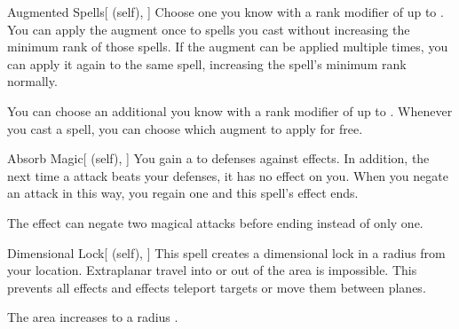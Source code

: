 \lowercase{\hypertarget{spell:Augmented Spells}{}}\label{spell:Augmented Spells}
\begin{attuneability}[Rank 5]{\hypertarget{spell:Augmented Spells}{Augmented Spells}}[ (self), ]
Choose one  you know with a rank modifier of up to .
You can apply the augment once to spells you cast without increasing the minimum rank of those spells.
If the augment can be applied multiple times, you can apply it again to the same spell, increasing the spell's minimum rank normally.

\rankline
{} You can choose an additional  you know with a rank modifier of up to .
Whenever you cast a spell, you can choose which augment to apply for free.
\end{attuneability}
\vspace{0.25em}



\lowercase{\hypertarget{spell:Absorb Magic}{}}\label{spell:Absorb Magic}
\begin{attuneability}[Rank 6]{\hypertarget{spell:Absorb Magic}{Absorb Magic}}[ (self), ]
You gain a   to defenses against  effects.
In addition, the next time a  attack beats your defenses, it has no effect on you.
When you negate an attack in this way, you regain one  and this spell's effect ends.

\rankline
{} The effect can negate two magical attacks before ending instead of only one.
\end{attuneability}
\vspace{0.25em}



\lowercase{\hypertarget{spell:Dimensional Lock}{}}\label{spell:Dimensional Lock}
\begin{attuneability}[Rank 6]{\hypertarget{spell:Dimensional Lock}{Dimensional Lock}}[ (self), ]
\targetrule
This spell creates a dimensional lock in a \arealarge radius  from your location.
Extraplanar travel into or out of the area is impossible.
This prevents all  effects and effects teleport targets or move them between planes.

\rankline
{} The area increases to a \areahuge radius .
\end{attuneability}
\vspace{0.25em}



